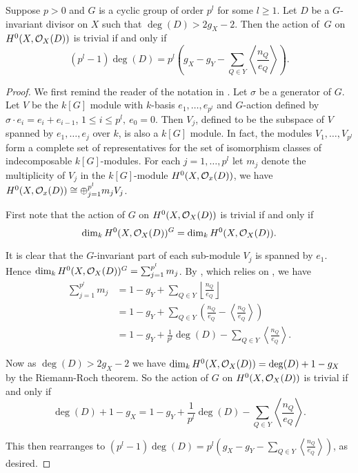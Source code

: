     \begin{prop}\label{nakaj}
    Suppose $p>0$ and $G$ is a cyclic group of order $p^l$ for some $l\geq 1$.
    Let $D$ be a $G$-invariant divisor on $X$ such that $\deg(D)>2g_X-2$.
    Then the action of~$G$ on $H^0(X,{\cal O}_X(D))$ is trivial if and only if
        \[ 
        (p^l-1)\deg(D)=p^l\left(g_X-g_Y-\sum_{Q\in Y}\left\langle \frac{n_Q}{e_Q} \right\rangle\right).
        \]
    \end{prop}
    \begin{proof}
    We first remind the reader of the notation in \cite{kako}.
    Let $\sigma$ be a generator of $G$.
    Let $V$ be the $k[G]$ module with $k$-basis $e_1,\ldots ,e_{p^l}$ and $G$-action defined by $\sigma\cdot e_i=e_i+e_{i-1}$, $1\leq i \leq p^l,\ e_0=0$.
    Then $V_j$, defined to be the subspace of $V$ spanned by $e_1,\ldots ,e_j$ over $k$, is also a $k[G]$ module.
    In fact, the modules $V_1,\ldots ,V_{p^l}$ form a complete set of representatives for the set of isomorphism classes of indecomposable $k[G]$-modules. For each $j=1,\ldots,p^l$ let $m_j$ denote the multiplicity of $V_j$ in the $k[G]$-module $H^0(X,{\cal O}_x(D))$, \ie we have $H^0(X,{\cal O}_x(D))\cong \oplus_{j=1}^{p^l}m_jV_j$.
    
    
    
    First note that the action of $G$ on $H^0(X,{\cal O}_X(D))$ is trivial if and only if
        \begin{equation}\label{triva}
        \dim_k H^0(X,{\cal O}_X(D))^G =\dim_k H^0(X,{\cal O}_X(D)).
        \end{equation}
    
    It is clear that the $G$-invariant part of each sub-module $V_j$ is spanned by $e_1$. 
    Hence $\dim_kH^0(X,{\cal O}_X(D))^G = \sum_{j=1}^{p^l} m_j$.
    By \cite[Thm. 2.1]{quaddiffequi}, which relies on \cite{cohogsheaves}, we have
        \begin{align*}
        \sum_{j=1}^{p^l} m_j & =  1- g_Y +\sum_{Q\in Y} \left\lfloor \frac{n_Q}{e_Q}\right\rfloor\\
        & =  1- g_Y + \sum_{Q\in Y} \left( \frac{n_Q}{e_Q} - \left\langle \frac{n_Q}{e_Q}\right\rangle \right) \\
        & =  1 - g_Y + \frac{1}{p^l}\deg(D) - \sum_{Q\in Y} \left\langle \frac{n_Q}{e_Q} \right\rangle.
        \end{align*}
    
    Now as $\deg(D)>2g_X-2$ we have $\dim_kH^0(X,{\cal O}_X(D)) =\deg(D)+1-g_X$ by the Riemann-Roch theorem. 
    So the action of $G$ on $H^0(X,{\cal O}_X(D))$ is trivial if and only if
        \begin{equation*}
        \deg(D)+1-g_X  = 1 - g_Y + \frac{1}{p^l}\deg(D) - \sum_{Q\in Y}\left\langle \frac{n_Q}{e_Q} \right\rangle. \label{hi}
        \end{equation*}
    
    This then rearranges to $(p^l-1)\deg(D)=p^l\left(g_X-g_Y-\sum_{Q\in Y}\left\langle \frac{n_Q}{e_Q} \right\rangle\right)$, as desired.
    \end{proof}


